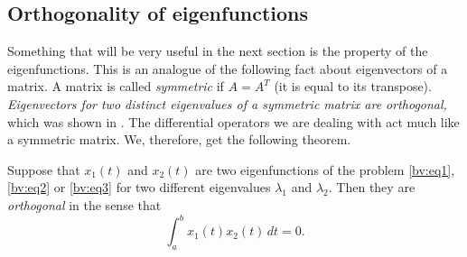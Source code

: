\documentclass{ximera}
\begin{document}
\subsection{Orthogonality of eigenfunctions}

Something that will be very useful in the next section is the \emph{} property of the eigenfunctions. This is an analogue of the following fact about eigenvectors of a matrix.  A matrix is called \emph{symmetric} if $A = A^T$ (it is equal to its transpose). \emph{Eigenvectors for two distinct eigenvalues of a symmetric matrix are orthogonal,} which was shown in .
The differential operators we are dealing with act much like a symmetric matrix. We, therefore, get the following theorem.

%
%
%

\begin{theorem}
    \label{bvp:orthogonaleigen}
    Suppose that $x_1(t)$ and $x_2(t)$ are two eigenfunctions of the problem \eqref{bv:eq1}, \eqref{bv:eq2} or \eqref{bv:eq3} for two different eigenvalues $\lambda_1$ and $\lambda_2$.  Then they are \emph{orthogonal} in the sense that
    \begin{equation*}
        \int_a^b x_1(t) x_2(t) \,dt = 0 .
    \end{equation*}
\end{theorem}
\end{document}
